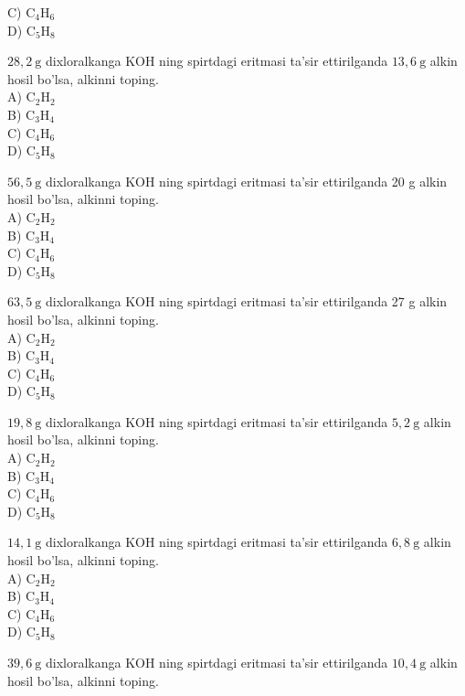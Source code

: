 C) $\mathrm{C}_{4} \mathrm{H}_{6}$\\
D) $\mathrm{C}_{5} \mathrm{H}_{8}$
  \item $28,2 \mathrm{~g}$ dixloralkanga KOH ning spirtdagi eritmasi ta'sir ettirilganda $13,6 \mathrm{~g}$ alkin hosil bo'lsa, alkinni toping.\\
A) $\mathrm{C}_{2} \mathrm{H}_{2}$\\
B) $\mathrm{C}_{3} \mathrm{H}_{4}$\\
C) $\mathrm{C}_{4} \mathrm{H}_{6}$\\
D) $\mathrm{C}_{5} \mathrm{H}_{8}$
  \item $56,5 \mathrm{~g}$ dixloralkanga KOH ning spirtdagi eritmasi ta'sir ettirilganda 20 g alkin hosil bo'lsa, alkinni toping.\\
A) $\mathrm{C}_{2} \mathrm{H}_{2}$\\
B) $\mathrm{C}_{3} \mathrm{H}_{4}$\\
C) $\mathrm{C}_{4} \mathrm{H}_{6}$\\
D) $\mathrm{C}_{5} \mathrm{H}_{8}$
  \item $63,5 \mathrm{~g}$ dixloralkanga KOH ning spirtdagi eritmasi ta'sir ettirilganda 27 g alkin hosil bo'lsa, alkinni toping.\\
A) $\mathrm{C}_{2} \mathrm{H}_{2}$\\
B) $\mathrm{C}_{3} \mathrm{H}_{4}$\\
C) $\mathrm{C}_{4} \mathrm{H}_{6}$\\
D) $\mathrm{C}_{5} \mathrm{H}_{8}$
  \item $19,8 \mathrm{~g}$ dixloralkanga KOH ning spirtdagi eritmasi ta'sir ettirilganda $5,2 \mathrm{~g}$ alkin hosil bo'lsa, alkinni toping.\\
A) $\mathrm{C}_{2} \mathrm{H}_{2}$\\
B) $\mathrm{C}_{3} \mathrm{H}_{4}$\\
C) $\mathrm{C}_{4} \mathrm{H}_{6}$\\
D) $\mathrm{C}_{5} \mathrm{H}_{8}$
  \item $14,1 \mathrm{~g}$ dixloralkanga KOH ning spirtdagi eritmasi ta'sir ettirilganda $6,8 \mathrm{~g}$ alkin hosil bo'lsa, alkinni toping.\\
A) $\mathrm{C}_{2} \mathrm{H}_{2}$\\
B) $\mathrm{C}_{3} \mathrm{H}_{4}$\\
C) $\mathrm{C}_{4} \mathrm{H}_{6}$\\
D) $\mathrm{C}_{5} \mathrm{H}_{8}$
  \item $39,6 \mathrm{~g}$ dixloralkanga KOH ning spirtdagi eritmasi ta'sir ettirilganda $10,4 \mathrm{~g}$ alkin hosil bo'lsa, alkinni toping.\\
